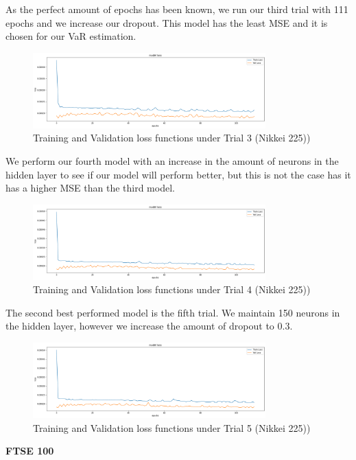\documentclass[a4paper,11pt,oneside]{book}
\begin{document}
As the perfect amount of epochs has been known, we run our third trial with 111 epochs and we increase our dropout. This model has the least MSE and it is chosen for our VaR estimation.\newline\newline\newline
\begin{figure}[!h]
	\centering
	\includegraphics[width=0.8\textwidth]{figures/Nik3}
	\caption{Training and Validation loss functions under Trial 3 (Nikkei 225))}
	\label{Nik3}
\end{figure}

We perform our fourth model with an increase in the amount of neurons in the hidden layer to see if our model will perform better, but this is not the case has it has a higher MSE than the third model.
\newline\newline\newline
\begin{figure}[!h]
	\centering
	\includegraphics[width=0.8\textwidth]{figures/Nik4}
	\caption{Training and Validation loss functions under Trial 4 (Nikkei 225))}
	\label{Nik4}
\end{figure}

The second best performed model is the fifth trial. We maintain 150 neurons in the hidden layer, however we increase the amount of dropout to 0.3.\newline
\begin{figure}[!h]
	\centering
	\includegraphics[width=0.8\textwidth]{figures/Nik5}
	\caption{Training and Validation loss functions under Trial 5 (Nikkei 225))}
	\label{Nik5}
\end{figure}
\newline\textbf{FTSE 100}\newline
\end{document}
